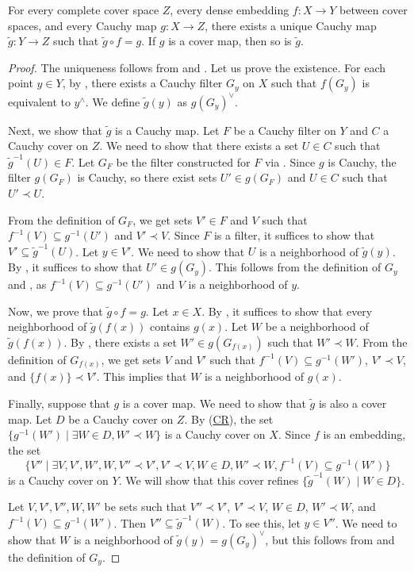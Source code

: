 \documentclass[pdflatex,sn-mathphys-num]{sn-jnl}
\newcommand{\axref}[1]{(\hyperref[ax:#1]{#1})}
\theoremstyle{definition}
\theoremstyle{remark}
\numberwithin{figure}{section}
\newcommand{\rb}{\prec}
\begin{document}
\begin{thm}
For every complete cover space $Z$, every dense embedding $f : X \to Y$ between cover spaces, and every Cauchy map $g : X \to Z$,
there exists a unique Cauchy map $\widetilde{g} : Y \to Z$ such that $\widetilde{g} \circ f = g$.
If $g$ is a cover map, then so is $\widetilde{g}$.
\end{thm}
\begin{proof}
The uniqueness follows from  and .
Let us prove the existence.
For each point $y \in Y$, by , there exists a Cauchy filter $G_y$ on $X$ such that $f(G_y)$ is equivalent to $y^\wedge$.
We define $\widetilde{g}(y)$ as $g(G_y)^\vee$.

Next, we show that $\widetilde{g}$ is a Cauchy map.
Let $F$ be a Cauchy filter on $Y$ and $C$ a Cauchy cover on $Z$.
We need to show that there exists a set $U \in C$ such that $\widetilde{g}^{-1}(U) \in F$.
Let $G_F$ be the filter constructed for $F$ via .
Since $g$ is Cauchy, the filter $g(G_F)$ is Cauchy, so there exist sets $U' \in g(G_F)$ and $U \in C$ such that $U' \rb U$.

From the definition of $G_F$, we get sets $V' \in F$ and $V$ such that $f^{-1}(V) \subseteq g^{-1}(U')$ and $V' \rb V$.
Since $F$ is a filter, it suffices to show that $V' \subseteq \widetilde{g}^{-1}(U)$.
Let $y \in V'$.
We need to show that $U$ is a neighborhood of $\widetilde{g}(y)$.
By , it suffices to show that $U' \in g(G_y)$.
This follows from the definition of $G_y$ and , as $f^{-1}(V) \subseteq g^{-1}(U')$ and $V$ is a neighborhood of $y$.

Now, we prove that $\widetilde{g} \circ f = g$.
Let $x \in X$.
By , it suffices to show that every neighborhood of $\widetilde{g}(f(x))$ contains $g(x)$.
Let $W$ be a neighborhood of $\widetilde{g}(f(x))$.
By , there exists a set $W' \in g(G_{f(x)})$ such that $W' \rb W$.
From the definition of $G_{f(x)}$, we get sets $V$ and $V'$ such that $f^{-1}(V) \subseteq g^{-1}(W')$, $V' \rb V$, and $\{ f(x) \} \rb V'$.
This implies that $W$ is a neighborhood of $g(x)$.

Finally, suppose that $g$ is a cover map.
We need to show that $\widetilde{g}$ is also a cover map.
Let $D$ be a Cauchy cover on $Z$.
By \axref{CR}, the set $\{ g^{-1}(W') \mid \exists W \in D, W' \rb W \}$ is a Cauchy cover on $X$.
Since $f$ is an embedding, the set
\[ \{ V'' \mid \exists V,V',W',W, V'' \rb V', V' \rb V, W \in D, W' \rb W, f^{-1}(V) \subseteq g^{-1}(W') \} \]
is a Cauchy cover on $Y$.
We will show that this cover refines $\{ \widetilde{g}^{-1}(W) \mid W \in D \}$.

Let $V,V',V'',W,W'$ be sets such that $V'' \rb V'$, $V' \rb V$, $W \in D$, $W' \rb W$, and $f^{-1}(V) \subseteq g^{-1}(W')$.
Then $V'' \subseteq \widetilde{g}^{-1}(W)$.
To see this, let $y \in V''$.
We need to show that $W$ is a neighborhood of $\widetilde{g}(y) = g(G_y)^\vee$, but this follows from  and the definition of $G_y$.
\end{proof}
\end{document}
